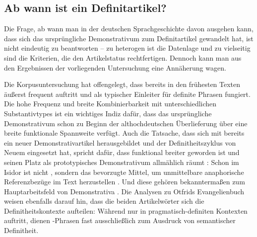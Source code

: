 \subsection{Ab wann ist  ein Definitartikel?}\label{sec:abwann}

Die Frage, ab wann man in der deutschen Sprachgeschichte davon ausgehen kann, dass sich das ursprüngliche Demonstrativum  zum Definitartikel gewandelt hat, ist nicht eindeutig zu beantworten -- zu heterogen ist die Datenlage und zu vielseitig sind die Kriterien, die den Artikelstatus rechtfertigen. Dennoch kann man aus den Ergebnissen der vorliegenden Untersuchung eine Annäherung wagen. 

Die Korpusuntersuchung hat offengelegt, dass  bereits in den frühesten Texten äußerst frequent auftritt und als typischer Einleiter für definite Phrasen fungiert. Die hohe Frequenz und breite Kombinierbarkeit mit unterschiedlichen Substantivtypes ist ein wichtiges Indiz dafür, dass das ursprüngliche Demonstrativum schon zu Beginn der althochdeutschen Überlieferung über eine breite funktionale Spannweite verfügt. Auch die Tatsache, dass sich mit  bereits ein neuer Demonstrativartikel herausgebildet und der Definitheitszyklus \parencite{Greenberg1978,vanGelderen2007} von Neuem eingesetzt hat, spricht dafür, dass  funktional breiter geworden ist und seinen Platz als prototypisches Demonstrativum allmählich räumt \parencite[ähnlich auch][]{Schlachter2012}: Schon im Isidor ist nicht , sondern   das bevorzugte Mittel, um unmittelbare anaphorische Referenzbezüge im Text herzustellen \parencite[139]{Oubouzar1989}. Und diese gehören bekanntermaßen zum Hauptarbeitsfeld von Demonstrativa  \parencite{Diessel1999}. Die Analysen zu Otfrids Evangelienbuch weisen ebenfalls darauf hin, dass die beiden Artikelwörter sich die Definitheitskontexte aufteilen: Während  nur in pragmatisch-definiten Kontexten auftritt, dienen -Phrasen fast ausschließlich zum Ausdruck von semantischer Definitheit. 

